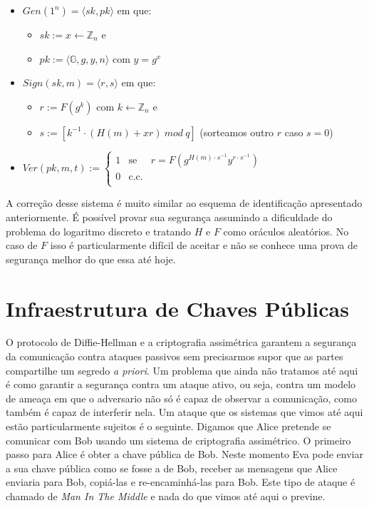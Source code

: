 \begin{itemize}
\item $Gen(1^n) = \langle sk, pk \rangle$ em que:
\begin{itemize}
\item $sk := x \leftarrow \mathbb{Z}_n$ e
\item $pk := \langle \mathbb{G}, g, y, n \rangle$ com $y = g^x$
\end{itemize}
\item $Sign(sk, m) = \langle r, s \rangle$ em que:
  \begin{itemize}
  \item $r := F(g^k)$ com $k \leftarrow \mathbb{Z}_n$ e
  \item $s := [k^{-1} \cdot (H(m) + xr)\ mod\ q]$ (sorteamos outro $r$ caso $s = 0$)
  \end{itemize}
\item $Ver(pk, m, t) := \left\{
    \begin{array}{lcl}
      1 & \textrm{se} & r = F(g^{H(m) \cdot s^{-1}} y^{r \cdot s^{-1}})\\
      0 & \textrm{c.c.} &\\
    \end{array}
    \right.$
\end{itemize}

A correção desse sistema é muito similar ao esquema de identificação apresentado anteriormente.
É possível provar sua segurança assumindo a dificuldade do problema do logaritmo discreto e tratando $H$ e $F$ como oráculos aleatórios.
No caso de $F$ isso é particularmente difícil de aceitar e não se conhece uma prova de segurança melhor do que essa até hoje.

\section{Infraestrutura de Chaves Públicas}
\label{sec:pki}

O protocolo de Diffie-Hellman e a criptografia assimétrica garantem a segurança da comunicação contra ataques passivos sem precisarmos supor que as partes compartilhe um segredo {\em a priori}.
Um problema que ainda não tratamos até aqui é como garantir a segurança contra um ataque ativo, ou seja, contra um modelo de ameaça em que o adversario não só é capaz de observar a comunicação, como também é capaz de interferir nela.
Um ataque que os sistemas que vimos até aqui estão particularmente sujeitos é o seguinte.
Digamos que Alice pretende se comunicar com Bob usando um sistema de criptografia assimétrico.
O primeiro passo para Alice é obter a chave pública de Bob.
Neste momento Eva pode enviar a sua chave pública como se fosse a de Bob, receber as mensagens que Alice enviaria para Bob, copiá-las e re-encaminhá-las para Bob.
Este tipo de ataque é chamado de {\em Man In The Middle} e nada do que vimos até aqui o previne.


